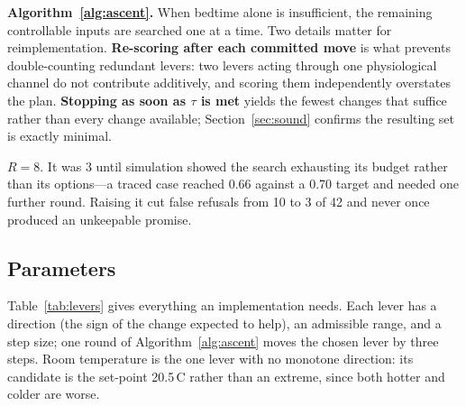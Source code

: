 \documentclass[conference]{IEEEtran}
\begin{document}
\textbf{Algorithm~\ref{alg:ascent}.} When bedtime alone is insufficient, the
remaining controllable inputs are searched one at a time. Two details matter for
reimplementation. \textbf{Re-scoring after each committed move} is what prevents
double-counting redundant levers: two levers acting through one physiological
channel do not contribute additively, and scoring them independently overstates
the plan. \textbf{Stopping as soon as $\tau$ is met} yields the fewest changes
that suffice rather than every change available;
Section~\ref{sec:sound} confirms the resulting set is exactly minimal.

$R = 8$. It was 3 until simulation showed the search exhausting its budget
rather than its options---a traced case reached 0.66 against a 0.70 target and
needed one further round. Raising it cut false refusals from 10 to 3 of 42 and
never once produced an unkeepable promise.

\subsection{Parameters}

Table~\ref{tab:levers} gives everything an implementation needs. Each lever has
a direction (the sign of the change expected to help), an admissible range, and
a step size; one round of Algorithm~\ref{alg:ascent} moves the chosen lever by
three steps. Room temperature is the one lever with no monotone direction: its
candidate is the set-point 20.5\,\textdegree C rather than an extreme, since
both hotter and colder are worse.
\end{document}
